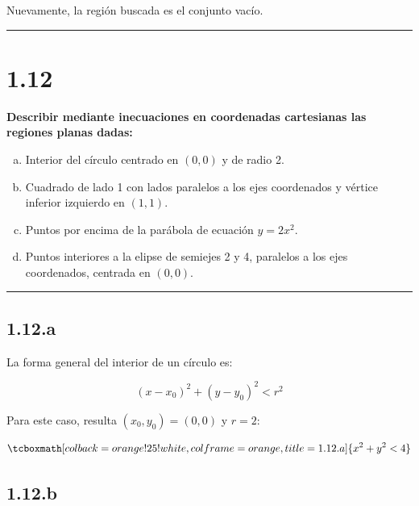 \documentclass{article}
\begin{document}
Nuevamente, la región buscada es el conjunto vacío.

\hrule
\vspace{10 pt}

\section*{1.12}
\label{sec:1.12}

\textbf{Describir mediante inecuaciones en coordenadas cartesianas las regiones planas dadas:}

\begin{enumerate}[(a)]
\bfseries
\item Interior del círculo centrado en $(0, 0)$ y de radio 2.

\item Cuadrado de lado 1 con lados paralelos a los ejes coordenados y vértice inferior izquierdo en $(1, 1)$.

\item Puntos por encima de la parábola de ecuación $y = 2x^2$.

\item Puntos interiores a la elipse de semiejes 2 y 4, paralelos a los ejes coordenados, centrada en $(0, 0)$.

\end{enumerate}
\hrule

\subsection*{1.12.a}
\label{subsec:1.12.a}

La forma general del interior de un círculo es:

\begin{equation}
(x-x_0)^2 + (y-y_0)^2 < r^2
\end{equation}

Para este caso, resulta $(x_0, y_0) = (0, 0)$ y $r=2$:

\begin{equation}
\tcboxmath[colback=orange!25!white,colframe=orange,title=1.12.a]
{ x^2 + y^2 < 4 }
\end{equation}

\subsection*{1.12.b}
\label{subsec:1.12.b}
\end{document}
